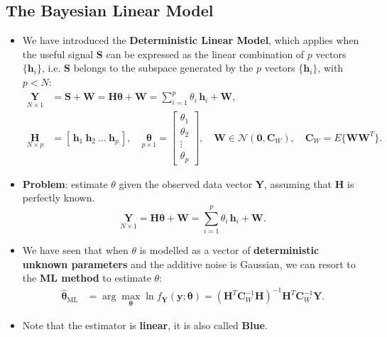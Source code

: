 \subsection{The Bayesian Linear Model}
\begin{itemize}
\item We have introduced the \textbf{Deterministic Linear Model}, which applies when the useful signal \textbf{S} can be expressed as the linear combination of \(p\) vectors \(\{\textbf{h}_i\}\), i.e. \textbf{S} belongs to the subspace generated by the \(p\) vectors \(\{\mathbf{h}_i\}\), with \(p<N\):
\begin{align*}
\underset{N\times 1}{\mathbf{Y}}
&= \mathbf{S} + \mathbf{W}
 = \mathbf{H}\boldsymbol{\theta} + \mathbf{W}
 = \sum_{i=1}^{p}\theta_i\,\mathbf{h}_i + \mathbf{W}, \\[6pt]
\underset{N\times p}{\mathbf{H}}
&= [\,\mathbf{h}_1\ \mathbf{h}_2\ \dots\ \mathbf{h}_p\,], \quad
\underset{p\times 1}{\boldsymbol{\theta}}
 = \begin{bmatrix}\theta_1 \\ \theta_2 \\ \vdots \\ \theta_p\end{bmatrix},\quad \mathbf{W} \in \mathcal{N}(\mathbf{0},\mathbf{C}_W), \quad
\mathbf{C}_W = E\{\mathbf{W}\mathbf{W}^{T}\}.
\end{align*}

\item \textbf{Problem}: estimate \(\theta\) given the observed data vector \textbf{Y}, assuming that \textbf{H} is perfectly known.
\[
\underset{N\times 1}{\mathbf{Y}}
= \mathbf{H}\boldsymbol{\theta} + \mathbf{W}
= \sum_{i=1}^{p}\theta_i\,\mathbf{h}_i + \mathbf{W}.
\]

\item We have seen that when \(\theta\) is modelled as a vector of \textbf{deterministic unknown parameters} and the additive noise is Gaussian, we can resort to the \textbf{ML method} to estimate \(\theta\):
\begin{align*}
\hat{\boldsymbol{\theta}}_{\text{ML}}
&= \arg\max_{\boldsymbol{\theta}} \ln f_{\mathbf{Y}}(\mathbf{y};\boldsymbol{\theta})= \left(\mathbf{H}^{T}\mathbf{C}_W^{-1}\mathbf{H}\right)^{-1}
    \mathbf{H}^{T}\mathbf{C}_W^{-1}\mathbf{Y}.
\end{align*}

\item Note that the estimator is \textbf{linear}, it is also called \textbf{Blue}.


\end{itemize}
